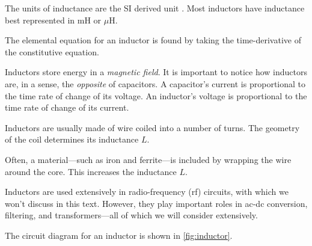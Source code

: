 \documentclass[electronics.tex]{subfiles}
\begin{document}
The units of inductance are the SI derived unit .
Most inductors have inductance best represented in mH or $\mu\text{H}$.
\tags{}

The elemental equation for an inductor is found by taking the time-derivative of the constitutive equation.
\tags{}


Inductors store energy in a \emph{magnetic field}.
It is important to notice how inductors are, in a sense, the \emph{opposite} of capacitors.
A capacitor's current is proportional to the time rate of change of its voltage.
An inductor's voltage is proportional to the time rate of change of its current.

Inductors are usually made of wire coiled into a number of turns.
The geometry of the coil determines its inductance $L$.
\tags{}

Often, a  material---such as iron and ferrite---is included by wrapping the wire around the core.
This increases the inductance $L$.
\tags{}

Inductors are used extensively in radio-frequency (rf) circuits, with which we won't discuss in this text.
However, they play important roles in ac-dc conversion, filtering, and transformers---all of which we will consider extensively.
\tags{}

The circuit diagram for an inductor is shown in \autoref{fig:inductor}.
\tags{}


\begin{exercises}

\end{exercises}
\end{document}
